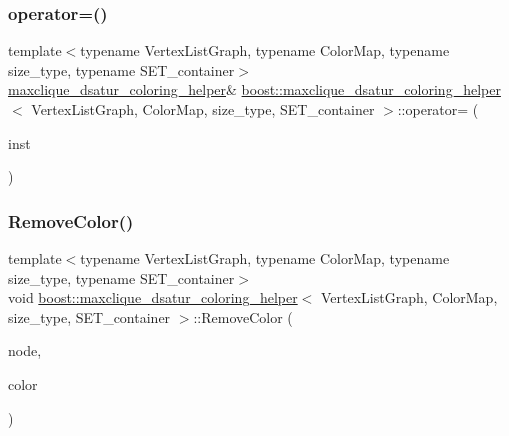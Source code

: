 \subsubsection{\texorpdfstring{operator=()}{operator=()}}
{\footnotesize\ttfamily template$<$typename Vertex\+List\+Graph, typename Color\+Map, typename size\+\_\+type, typename S\+E\+T\+\_\+container$>$ \\
\hyperlink{classboost_1_1maxclique__dsatur__coloring__helper}{maxclique\+\_\+dsatur\+\_\+coloring\+\_\+helper}\& \hyperlink{classboost_1_1maxclique__dsatur__coloring__helper}{boost\+::maxclique\+\_\+dsatur\+\_\+coloring\+\_\+helper}$<$ Vertex\+List\+Graph, Color\+Map, size\+\_\+type, S\+E\+T\+\_\+container $>$\+::operator= (\begin{DoxyParamCaption}\item[{const \hyperlink{classboost_1_1maxclique__dsatur__coloring__helper}{maxclique\+\_\+dsatur\+\_\+coloring\+\_\+helper}$<$ Vertex\+List\+Graph, Color\+Map, size\+\_\+type, S\+E\+T\+\_\+container $>$ \&}]{inst }\end{DoxyParamCaption})\hspace{0.3cm}{\ttfamily [delete]}}

\mbox{\label{classboost_1_1maxclique__dsatur__coloring__helper_afd706b1d8ee597c8ebea8fc043a3047b}} 
\subsubsection{\texorpdfstring{Remove\+Color()}{RemoveColor()}}
{\footnotesize\ttfamily template$<$typename Vertex\+List\+Graph, typename Color\+Map, typename size\+\_\+type, typename S\+E\+T\+\_\+container$>$ \\
void \hyperlink{classboost_1_1maxclique__dsatur__coloring__helper}{boost\+::maxclique\+\_\+dsatur\+\_\+coloring\+\_\+helper}$<$ Vertex\+List\+Graph, Color\+Map, size\+\_\+type, S\+E\+T\+\_\+container $>$\+::Remove\+Color (\begin{DoxyParamCaption}\item[{size\+\_\+type}]{node,  }\item[{size\+\_\+type}]{color }\end{DoxyParamCaption})\hspace{0.3cm}{\ttfamily [inline]}}



